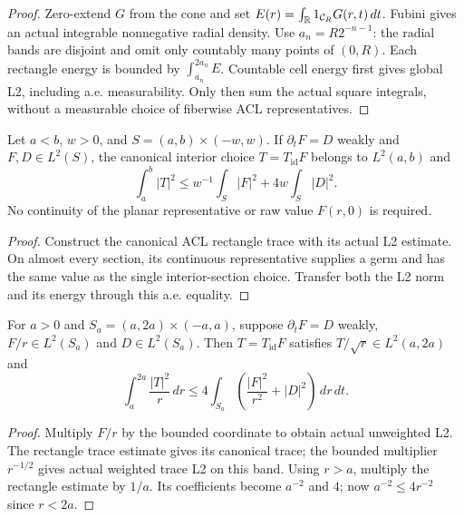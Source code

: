 \begin{proof}
\leanok
Zero-extend $G$ from the cone and set $E(r)=\int_{\mathbb{R}} 1_{\mathcal C_R}G(r,t)\,dt$.
Fubini gives an actual integrable nonnegative radial density.
Use $a_n=R2^{-n-1}$: the radial bands are disjoint and omit only
countably many points of $(0,R)$. Each rectangle energy is bounded by
$\int_{a_n}^{2a_n}E$.
Countable cell energy first gives global L2, including a.e. measurability.
Only then sum the actual square integrals, without a measurable choice of
fiberwise ACL representatives.
\end{proof}

\begin{lemma}
\label{lem:canonical-rectangle-trace}
\leanok
Let $a<b$, $w>0$, and $S=(a,b)\times(-w,w)$.
If $\partial_tF=D$ weakly and $F,D\in L^2(S)$, the canonical interior
choice $T=T_{\mathrm{id}}F$ belongs to $L^2(a,b)$ and
\[
 \int_a^b|T|^2\le w^{-1}\int_S|F|^2+4w\int_S|D|^2.
\]
No continuity of the planar representative or raw value $F(r,0)$ is required.
\end{lemma}

\begin{proof}
\leanok
Construct the canonical ACL rectangle trace with its actual L2 estimate.
On almost every section, its continuous representative supplies a germ
and has the same value as the single interior-section choice.
Transfer both the L2 norm and its energy through this a.e. equality.
\end{proof}

\begin{lemma}
\label{lem:canonical-weighted-band-trace}
\leanok
For $a>0$ and $S_a=(a,2a)\times(-a,a)$, suppose
$\partial_tF=D$ weakly, $F/r\in L^2(S_a)$ and $D\in L^2(S_a)$.
Then $T=T_{\mathrm{id}}F$ satisfies $T/\sqrt r\in L^2(a,2a)$ and
\[
 \int_a^{2a}\frac{|T|^2}{r}\,dr
 \le4\int_{S_a}\left(\frac{|F|^2}{r^2}+|D|^2\right)\,dr\,dt.
\]
\end{lemma}

\begin{proof}
\leanok
Multiply $F/r$ by the bounded coordinate to obtain actual unweighted L2.
The rectangle trace estimate gives its canonical trace; the bounded
multiplier $r^{-1/2}$ gives actual weighted trace L2 on this band.
Using $r>a$, multiply the rectangle estimate by $1/a$.
Its coefficients become $a^{-2}$ and $4$; now
$a^{-2}\le4r^{-2}$ since $r<2a$.
\end{proof}

